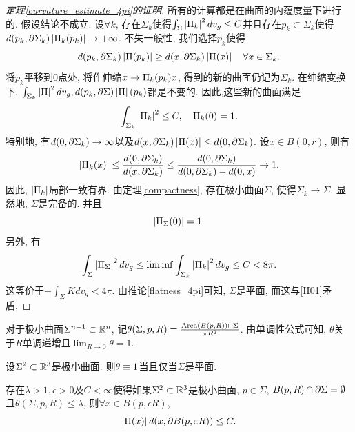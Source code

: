 \begin{proof}[定理\eqref{curvature_estimate_4pi}的证明]
    所有的计算都是在曲面的内蕴度量下进行的. 假设结论不成立. 设$\forall k$, 存在$\Sigma_k$使得$\int_\Sigma \abs{\II_k}^2dv_g \le C$并且存在$p_k \subset \Sigma_k$使得$d(p_k,\P \Sigma_k)\abs{\II_k(p_k)} \to +\infty$. 不失一般性, 我们选择$p_k$使得
    \begin{equation}
        d(p_k, \P \Sigma_k)\abs{\II(p_k)} \ge d(x,\P \Sigma_k)\abs{\II(x)} \s \forall x \in \Sigma_k.
    \end{equation}
    将$p_k$平移到0点处, 将作伸缩$x \to \II_k(p_k)x$, 得到的新的曲面仍记为$\Sigma_k$. 在绅缩变换下,  $\int_{\Sigma_k}\abs{\II}^2dv_g, d(p_k,\P \Sigma)\abs{\II}(p_k)$都是不变的.  因此,这些新的曲面满足
    \begin{equation} \label{iikk0}
        \int_{\Sigma_k} \abs{\II_k}^2 \le C, \s \II_k(0) =1.
    \end{equation}
    特别地, 有$d(0,\P \Sigma_k) \to \infty$以及$d(x,\P \Sigma_k) \abs{\II(x)} \le d(0,\P \Sigma_k)$. 设$x \in B(0,r)$, 则有
    \begin{equation}
        \abs{\II_k(x)} \le \frac{d(0,\P \Sigma_k)}{d(x,\P \Sigma_k)} \le \frac{d(0,\P \Sigma_k)}{d(0,\P \Sigma_k) - d(0,x)} \to 1.
    \end{equation}
    因此, $\abs{\II_k}$局部一致有界. 由定理\eqref{compactness}, 存在极小曲面$\Sigma$, 使得$\Sigma_k \to \Sigma$. 显然地, $\Sigma$是完备的.  并且
    \begin{equation} \label{II01}
        \abs{\II_\Sigma(0)}=1.
    \end{equation}
    另外, 有
    \begin{equation}
        \int_\Sigma \abs{\II_\Sigma}^2dv_g \le \liminf \int_{\Sigma_k} \abs{\II_k}^2dv_g \le C < 8\pi.
    \end{equation}
    这等价于$-\int_\Sigma K dv_g < 4\pi$. 由推论\eqref{flatness_4pi}可知, $\Sigma$是平面, 而这与\eqref{II01}矛盾.
\end{proof}
对于极小曲面$\Sigma^{n-1} \subset \R^n$, 记$\theta(\Sigma,p,R)=\frac{\Area(B(p,R))\cap \Sigma}{\pi R^2}$. 由单调性公式可知, $\theta$关于$R$单调递增且$\mathop{\lim}_{R\to 0} \theta=1$.
\begin{lemma}\label{theta_flat}
    设$\Sigma^{2}\subset \R^3$是极小曲面. 则$\theta \eq 1$当且仅当$\Sigma$是平面.
\end{lemma}
\begin{theorem}
    存在$\lambda >1, \epsilon>0$及$C< \infty$使得如果$\Sigma^2\subset \R^3$是极小曲面, $p\in \Sigma$, $B(p,R) \cap \P \Sigma = \emptyset$且$\theta(\Sigma, p, R) \le \lambda$, 则$\forall x\in  B(p, \epsilon R)$,
    \begin{equation}
        \abs{\II(x)}d(x,\P B(p,\epsilon R)) \le C.
    \end{equation}
\end{theorem}
